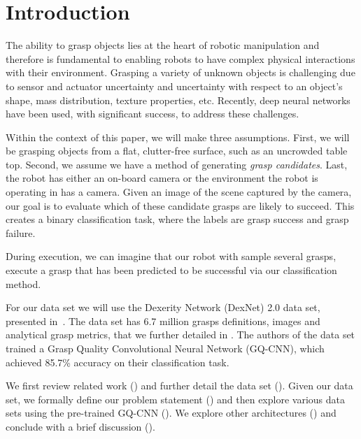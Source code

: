 
\section{Introduction}
\label{sec:intro}

The ability to grasp objects lies at the heart of robotic manipulation and therefore is fundamental to enabling robots to have complex physical interactions with their environment. 
Grasping a variety of unknown objects is challenging due to sensor and actuator uncertainty and uncertainty with respect to an object's shape, mass distribution, texture properties, etc. 
Recently, deep neural networks have been used, with significant success, to address these challenges. 

Within the context of this paper, we will make three assumptions. 
First, we will be grasping objects from a flat, clutter-free surface, such as an uncrowded table top. 
Second, we assume we have a method of generating \textit{grasp candidates}. 
Last, the robot has either an on-board camera or the environment the robot is operating in has a camera. 
Given an image of the scene captured by the camera, our goal is to evaluate which of these candidate grasps are likely to succeed. 
This creates a binary classification task, where the labels are grasp success and grasp failure. 

During execution, we can imagine that our robot with sample several grasps, execute a grasp that has been predicted to be successful via our classification method.  

For our data set we will use the Dexerity Network (DexNet) 2.0 data set, presented in~\cite{mahler2017dex}. 
The data set has 6.7 million grasps definitions, images and analytical grasp metrics, that we further detailed in . 
The authors of the data set trained a Grasp Quality Convolutional Neural Network (GQ-CNN), which achieved 85.7\% accuracy on their classification task.


We first review related work () and further detail the data set (). 
Given our data set, we formally define our problem statement () and then explore various data sets using the pre-trained GQ-CNN (). 
We explore other architectures () and conclude with a brief discussion (). 

